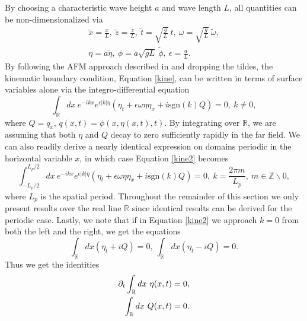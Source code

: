 \documentclass{JFM_Style/jfm}
\begin{document}
By choosing a characteristic wave height $a$ and wave length $L$, all quantities can be non-dimensionalized via
\begin{align*}
\tilde{x} = \frac{x}{L}, ~\tilde{z} = \frac{z}{L}, ~ \tilde{t} = \sqrt{\frac{g}{L}}~t, ~\omega = \sqrt{\frac{g}{L}}~\tilde{\omega}, \\
\eta = a \tilde{\eta}, ~ \phi  = a\sqrt{gL}~\tilde{\phi} , ~ \epsilon = \frac{a}{L}.
\end{align*}
By following the AFM approach described in \cite{afm,ashton} and dropping the tildes, the kinematic boundary condition, Equation \eqref{kine}, can be written in terms of surface variables alone via the integro-differential equation
\begin{equation}
\int_{\mathbb{R}}dx~e^{-ikx}e^{\epsilon|k|\eta}\left(\eta_{t} +
  \epsilon \omega \eta \eta_{x} + i \mbox{sgn}(k)Q \right) = 0, ~
k\neq 0,
\label{kine2}
\end{equation}
where $Q=q_{x}$, $q(x,t) = \phi(x,\eta(x,t),t)$.  By integrating over $\mathbb{R}$, we are assuming that both $\eta$ and $Q$ decay to zero sufficiently rapidly in the far field.  We can also readily derive a nearly identical expression on domains periodic in the horizontal variable $x$, in which case Equation \eqref{kine2} becomes
\begin{equation}
\int_{-L_{p}/2}^{L_{p}/2}dx~e^{-ikx}e^{\epsilon|k|\eta}\left(\eta_{t} +
  \epsilon \omega \eta \eta_{x} + i \mbox{sgn}(k)Q \right) = 0, ~ k = \frac{2\pi m}{L_{p}}, ~ m\in \mathbb{Z}\backslash{0},
\label{integro1per}
\end{equation}
where $L_p$ is the spatial period.  Throughout the remainder of this section we only present results over the real line $\mathbb{R}$ since identical results can be derived for the periodic case.
Lastly, we note that if in Equation \eqref{kine2} we approach $k=0$ from both the left and the right, we get the equations
\[
\int_{\mathbb{R}}dx \left(\eta_{t} + i Q \right) = 0, ~ \int_{\mathbb{R}}dx \left(\eta_{t} - i Q \right) = 0.
\]
Thus we get the identities
\begin{align}
\partial_{t}\int_{\mathbb{R}} dx ~\eta(x,t) & = 0, \label{zavsurf}\\
\int_{\mathbb{R}} dx ~Q(x,t) & = 0. \label{zavpot}
\end{align}
\end{document}

